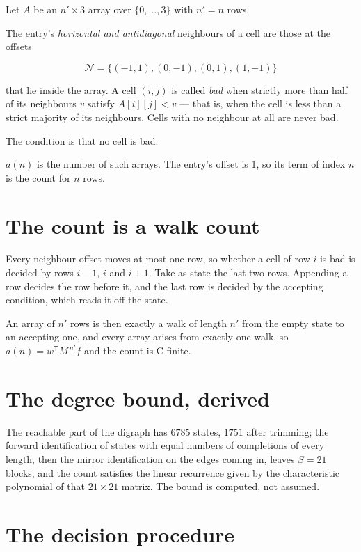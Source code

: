 \documentclass[11pt]{article}
\theoremstyle{definition}
\begin{document}
Let $A$ be an $n' \times 3$ array over $\{0,\dots,3\}$ with $n' = n$ rows.

The entry's {\itshape horizontal and antidiagonal} neighbours of a cell are those at the offsets

\[\mathcal{N} = \{(-1,1), (0,-1), (0,1), (1,-1)\}\]

that lie inside the array. A cell $(i,j)$ is called {\itshape bad} when strictly more than half of its neighbours $v$ satisfy $A[i][j] < v$ --- that is, when the cell is less than a strict majority of its neighbours. Cells with no neighbour at all are never bad.

The condition is that no cell is bad.

$a(n)$ is the number of such arrays. The entry's offset is 1, so its term of index $n$ is the count for $n$ rows.

\section{The count is a walk count}

Every neighbour offset moves at most one row, so whether a cell of row $i$ is bad is decided by rows $i-1$, $i$ and $i+1$. Take as state the last two rows. Appending a row decides the row before it, and the last row is decided by the accepting condition, which reads it off the state.

An array of $n'$ rows is then exactly a walk of length $n'$ from the empty state to an accepting one, and every array arises from exactly one walk, so $a(n) = w^{\mathsf T}M^{\,n'}f$ and the count is C-finite.

\section{The degree bound, derived}

The reachable part of the digraph has $6785$ states, $1751$ after trimming; the forward identification of states with equal numbers of completions of every length, then the mirror identification on the edges coming in, leaves $S = 21$ blocks, and the count satisfies the linear recurrence given by the characteristic polynomial of that $21\times21$ matrix. The bound is computed, not assumed.

\section{The decision procedure}
\end{document}
